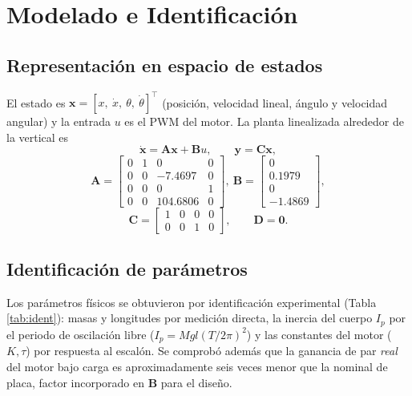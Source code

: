 \documentclass[conference]{IEEEtran}
\newcommand{\vect}[1]{\mathbf{#1}}
\newcommand{\mat}[1]{\mathbf{#1}}
\begin{document}
\section{Modelado e Identificaci\'on}
\subsection{Representaci\'on en espacio de estados}
El estado es $\vect{x}=[x,\ \dot{x},\ \theta,\ \dot{\theta}]^\top$ (posici\'on,
velocidad lineal, \'angulo y velocidad angular) y la entrada $u$ es el PWM del
motor. La planta linealizada alrededor de la vertical es
\begin{equation}
\dot{\vect{x}}=\mat{A}\vect{x}+\mat{B}u,\qquad \vect{y}=\mat{C}\vect{x},
\end{equation}
\begin{equation}
\mat{A}=\begin{bmatrix}0&1&0&0\\0&0&-7.4697&0\\0&0&0&1\\0&0&104.6806&0\end{bmatrix},\
\mat{B}=\begin{bmatrix}0\\0.1979\\0\\-1.4869\end{bmatrix},
\end{equation}
\begin{equation}
\mat{C}=\begin{bmatrix}1&0&0&0\\0&0&1&0\end{bmatrix},\qquad \mat{D}=\vect{0}.
\end{equation}

\subsection{Identificaci\'on de par\'ametros}
Los par\'ametros f\'isicos se obtuvieron por identificaci\'on experimental (Tabla
\ref{tab:ident}): masas y longitudes por medici\'on directa, la inercia del cuerpo
$I_p$ por el periodo de oscilaci\'on libre ($I_p=Mgl(T/2\pi)^2$) y las constantes
del motor ($K,\tau$) por respuesta al escal\'on. Se comprob\'o adem\'as que la
ganancia de par \emph{real} del motor bajo carga es aproximadamente seis veces
menor que la nominal de placa, factor incorporado en $\mat{B}$ para el dise\~no.
\end{document}
